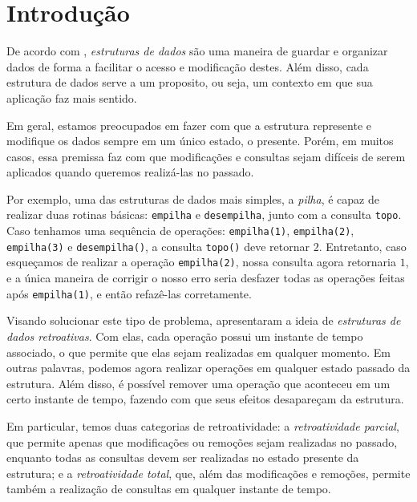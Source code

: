 
\chapter{Introdução}
\label{cap:introducao}

De acordo com \citet{10.5555/1614191}, \emph{estruturas de dados} são uma maneira de guardar e organizar dados de forma a facilitar o acesso e modificação destes. Além disso, cada estrutura de dados serve a um proposito, ou seja, um contexto em que sua aplicação faz mais sentido.

Em geral, estamos preocupados em fazer com que a estrutura represente e modifique os dados sempre em um único estado, o presente. Porém, em muitos casos, essa premissa faz com que modificações e consultas sejam difíceis de serem aplicados quando queremos realizá-las no passado.

Por exemplo, uma das estruturas de dados mais simples, a \emph{pilha}, é capaz de realizar duas rotinas básicas: \texttt{empilha} e \texttt{desempilha}, junto com a consulta \texttt{topo}. Caso tenhamos uma sequência de operações: \texttt{empilha(1)}, \texttt{empilha(2)}, \texttt{empilha(3)} e \texttt{desempilha()}, a consulta \texttt{topo()} deve retornar $2$. Entretanto, caso esqueçamos de realizar a operação \texttt{empilha(2)}, nossa consulta agora retornaria $1$, e a única maneira de corrigir o nosso erro seria desfazer todas as operações feitas após \texttt{empilha(1)}, e então refazê-las corretamente.

Visando solucionar este tipo de problema, \citet{10.1145/1240233.1240236} apresentaram a ideia de \emph{estruturas de dados retroativas}. Com elas, cada operação possui um instante de tempo associado, o que permite que elas sejam realizadas em qualquer momento. Em outras palavras, podemos agora realizar operações em qualquer estado passado da estrutura. Além disso, é possível remover uma operação que aconteceu em um certo instante de tempo, fazendo com que seus efeitos desapareçam da estrutura.

Em particular, temos duas categorias de retroatividade: a \emph{retroatividade parcial}, que permite apenas que modificações ou remoções sejam realizadas no passado, enquanto todas as consultas devem ser realizadas no estado presente da estrutura; e a \emph{retroatividade total}, que, além das modificações e remoções, permite também a realização de consultas em qualquer instante de tempo.

